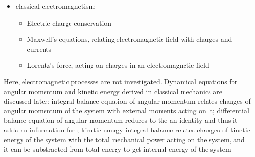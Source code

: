 \documentclass[letterpaper,10pt,english]{jupyterBook}
\begin{document}
\begin{itemize}
\begin{itemize}
\end{itemize}

\item {} 
\sphinxAtStartPar
classical electromagnetism:
\begin{itemize}
\item {} 
\sphinxAtStartPar
Electric charge conservation

\item {} 
\sphinxAtStartPar
Maxwell’s equations, relating electromagnetic field with charges and currents

\item {} 
\sphinxAtStartPar
Lorentz’s force, acting on charges in an electromagnetic field

\end{itemize}

\end{itemize}

\sphinxAtStartPar
Here, electromagnetic processes are not investigated. Dynamical equations for angular momentum and kinetic energy derived in classical mechanics are discussed later: integral balance equation of angular momentum relates changes of angular momentum of the system with external moments acting on it; differential balance equation of angular momentum reduces to the an identity \sphinxhyphen{} and thus it adds no information \sphinxhyphen{} for ; kinetic energy integral balance relates changes of kinetic energy of the system with the total mechanical power acting on the system, and it can be substracted from total energy to get internal energy of the system.
\end{document}

